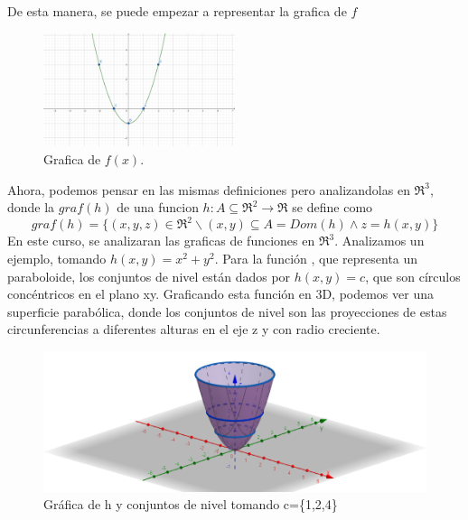 \begin{definition} [Grafica de $f$]
De esta manera, se puede empezar a representar la grafica de $f$
\begin{figure}[h!] %
    \centering
    \includegraphics[width=0.5\textwidth]{../figs/r2_grafica.png} %
    \caption{Grafica de $f(x)$.}
    \label{fig:ejemplo2} %
\end{figure}
\end{definition}
Ahora, podemos pensar en las mismas definiciones pero analizandolas en $\Re^{3}$, donde la $graf (h)$ de una funcion $h: A\subseteq\Re^{2}\rightarrow\Re$ se define como
 \[
graf(h)=\{(x,y,z)\in\Re^2 \backslash (x,y)\subseteq A=Dom(h) \land z=h(x,y) \}
 \]
En este curso, se analizaran las graficas de funciones en  $\Re^{3}$. Analizamos un ejemplo, tomando $h(x,y)=x^2+y^2$.
Para la función , que representa un paraboloide, los conjuntos de nivel están dados por $h(x,y)=c$, que son círculos concéntricos en el plano xy. Graficando esta función en 3D, podemos ver una superficie parabólica, donde los conjuntos de nivel son las proyecciones de estas circunferencias a diferentes alturas en el eje z y con radio creciente.
\begin{figure}[h!] %
    \centering
    \includegraphics[width=1\textwidth]{../figs/r3_grafica.png} %
    \caption{\small{ Gráfica de h y conjuntos de nivel tomando 
    c=\{1,2,4}\}}
    \label{fig:ejemplo3} %
\end{figure}

